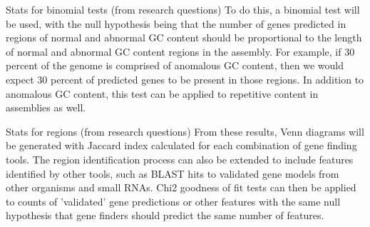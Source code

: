 Stats for binomial tests (from research questions)
To do this, a binomial test will be used, with the null hypothesis
being that the number of genes predicted in regions of normal and
abnormal GC content should be proportional to the length of normal and
abnormal GC content regions in the assembly. For example, if 30
percent of the genome is comprised of anomalous GC content, then we
would expect 30 percent of predicted genes to be present in those
regions. In addition to anomalous GC content, this test can be applied
to repetitive content in assemblies as well.

Stats for regions (from research questions)
From these results, Venn diagrams will be generated with
Jaccard index calculated for each combination of gene finding
tools. The region identification process can also be extended to
include features identified by other tools, such as BLAST hits to
validated gene models from other organisms and small RNAs. Chi2
goodness of fit tests can then be applied to counts of 'validated'
gene predictions or other features with the same null hypothesis that
gene finders should predict the same number of features.
